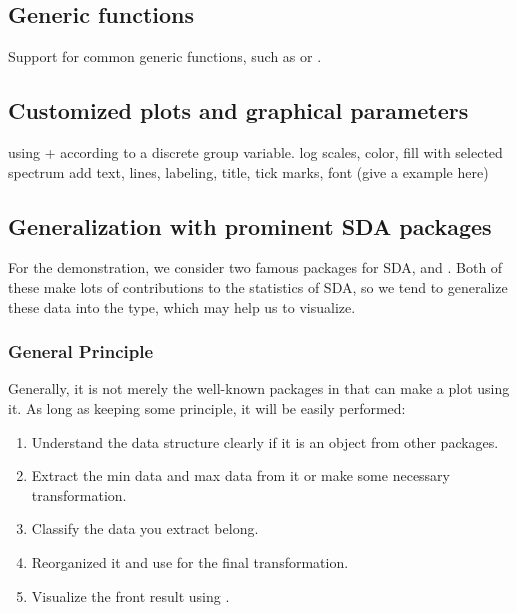 \documentclass[article]{jss}
\begin{document}
\subsection{Generic functions}
Support for common generic functions, such as  or .




\subsection{Customized plots and graphical parameters}
using +  according to a discrete group variable.
log scales, color, fill with selected spectrum
add text, lines, labeling, title, tick marks, font
(give a example here)
 


\subsection{Generalization with prominent SDA packages}

For the demonstration, we consider two famous  packages for SDA,  \cite{HistDAWass} and  \cite{MAINT.Data}. Both of these make lots of contributions to the statistics of SDA, so we tend to generalize these data into the  type, which may help us to visualize.

\subsubsection{General Principle}\label{sec:genPrin}

Generally, it is not merely the well-known packages in  that can make a plot using it. As long as keeping some principle, it will be easily performed:

\begin{enumerate}
  \item Understand the data structure clearly if it is an object from other packages.
  \item Extract the min data and max data from it or make some necessary transformation.
  \item Classify the data you extract belong.
  \item Reorganized it and use  for the final transformation.
  \item Visualize the front result using .
\end{enumerate}
\end{document}
